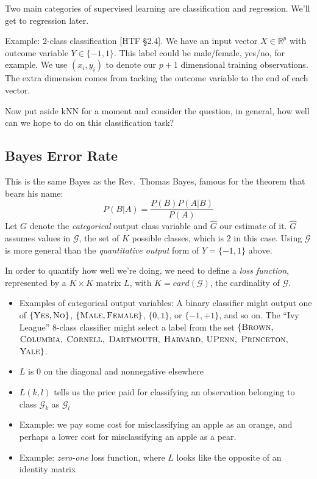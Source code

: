 \documentclass[a4paper]{article}
\begin{document}
Two main categories of supervised learning are classification and regression.  We'll get to regression later.

Example: 2-class classification [HTF \S 2.4].  We have an input vector $X\in \mathbb{R}^p$ with outcome variable $Y\in\{-1,1\}$. This label could be male/female, yes/no, for example.  We use $(x_i,y_i)$ to denote our $p+1$ dimensional training observations.  The extra dimension comes from tacking the outcome variable to the end of each vector.

Now put aside kNN for a moment and consider the question, in general, how well can we hope to do on this classification task?

\subsection{Bayes Error Rate}
This is the same Bayes as the Rev.\ Thomas Bayes, famous for the theorem that bears his name:
$$P(B|A) = \frac{P(B)P(A|B)}{P(A)}$$
Let $G$ denote the \emph{categorical} output class variable and $\hat G$ our estimate of it.  $\hat G$ assumes values in $\mathcal G$, the set of $K$ possible classes, which is $2$ in this case.  Using $\mathcal G$ is more general than the \emph{quantitative output} form of $Y=\{-1,1\}$ above.

In order to quantify how well we're doing, we need to define a \emph{loss function}, represented by a $K\times K$ matrix $L$, with $K=card(\mathcal{G})$, the cardinality of $\mathcal G$.

\begin{itemize}
\item Examples of categorical output variables: A binary classifier might output one of $\{\textsc{Yes}, \textsc{No}\}$, $\{\textsc{Male}, \textsc{Female}\}$, $\{0, 1\}$, or $\{-1, +1\}$, and so on. The ``Ivy League'' 8-class classifier might select a label from the set
$\{\textsc{Brown},$ $\textsc{Columbia},$ $\textsc{Cornell},$ $\textsc{Dartmouth},$ $\textsc{Harvard},$ $\textsc{UPenn},$ $\textsc{Princeton},$ $\textsc{Yale}\}$.
\item $L$ is 0 on the diagonal and nonnegative elsewhere
\item $L(k,l)$ tells us the price paid for classifying an observation belonging to class $\mathcal{G}_k$ as $\mathcal{G}_l$
\item Example: we pay some cost for misclassifying an apple as an orange, and perhaps a lower cost for misclassifying an apple as a pear.
\item Example: \emph{zero-one} loss function, where $L$ looks like the opposite of an identity matrix
\end{itemize}
\end{document}
